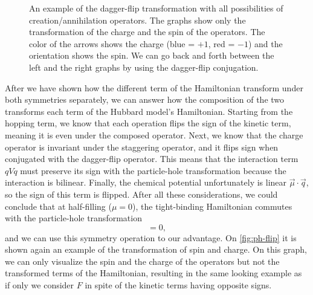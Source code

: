 \begin{figure}
\begin{center}
  \end{center}
  \caption{An example of the dagger-flip transformation with all possibilities of creation/annihilation operators. The graphs show only the transformation of the charge and the spin of the operators. The color of the arrows shows the charge (blue = $+1$, red = $-1$) and the orientation shows the spin. We can go back and forth between the left and the right graphs by using the dagger-flip conjugation.}
  \label{fig:dagger-flip}
\end{figure}

After we have shown how the different term of the Hamiltonian transform under both symmetries separately, we can answer how the composition of the two transforms each term of the Hubbard model's Hamiltonian. Starting from the hopping term, we know that each operation flips the sign of the kinetic term, meaning it is even under the composed operator. Next, we know that the charge operator is invariant under the staggering operator, and it flips sign when conjugated with the dagger-flip operator. This means that the interaction term $qVq$ must preserve its sign with the particle-hole transformation because the interaction is bilinear. Finally, the chemical potential unfortunately is linear $\vec{\mu}\cdot \vec{q}$, so the sign of this term is flipped. After all these considerations, we could conclude that at half-filling ($\mu = 0$), the tight-binding Hamiltonian commutes with the particle-hole transformation
\begin{equation}
  [H, XF] = 0,
\end{equation} 
and we can use this symmetry operation to our advantage. On  \cref{fig:ph-flip} it is shown again an example of the transformation of spin and charge. On this graph, we can only visualize the spin and the charge of the operators but not the transformed terms of the Hamiltonian, resulting in the same looking example as if only we consider $F$ in spite of the kinetic terms having opposite signs.

